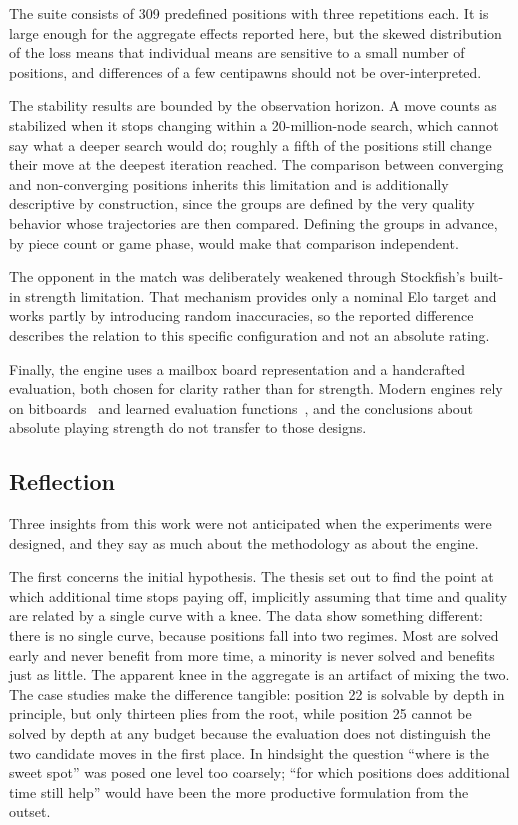 The suite consists of 309 predefined positions with three repetitions each. It is
large enough for the aggregate effects reported here, but the skewed distribution
of the loss means that individual means are sensitive to a small number of
positions, and differences of a few centipawns should not be over-interpreted.

The stability results are bounded by the observation horizon. A move counts as
stabilized when it stops changing within a 20-million-node search, which cannot
say what a deeper search would do; roughly a fifth of the positions still change
their move at the deepest iteration reached. The comparison between converging
and non-converging positions inherits this limitation and is additionally
descriptive by construction, since the groups are defined by the very quality
behavior whose trajectories are then compared. Defining the groups in advance, by
piece count or game phase, would make that comparison independent.

The opponent in the match was deliberately weakened through Stockfish's built-in
strength limitation. That mechanism provides only a nominal Elo target and works
partly by introducing random inaccuracies, so the reported difference describes
the relation to this specific configuration and not an absolute rating.

Finally, the engine uses a mailbox board representation and a handcrafted
evaluation, both chosen for clarity rather than for strength. Modern engines rely
on bitboards~\cite{cpw_bitboards} and learned evaluation
functions~\cite{silver2018alphazero}, and the conclusions about absolute playing
strength do not transfer to those designs.

\subsection{Reflection}
\label{subsec:discussion_reflection}

Three insights from this work were not anticipated when the experiments were
designed, and they say as much about the methodology as about the engine.

The first concerns the initial hypothesis. The thesis set out to find the point at
which additional time stops paying off, implicitly assuming that time and quality
are related by a single curve with a knee. The data show something different:
there is no single curve, because positions fall into two regimes. Most are solved
early and never benefit from more time, a minority is never solved and benefits
just as little. The apparent knee in the aggregate is an artifact of mixing the
two. The case studies make the difference tangible: position 22 is solvable by
depth in principle, but only thirteen plies from the root, while position 25
cannot be solved by depth at any budget because the evaluation does not
distinguish the two candidate moves in the first place. In hindsight the question ``where is the sweet spot'' was posed one level too
coarsely; ``for which positions does additional time still help'' would have been
the more productive formulation from the outset.

